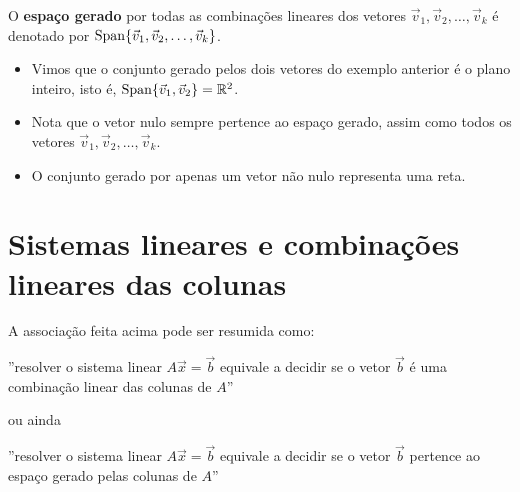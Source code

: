 \documentclass[../livro.tex]{subfiles}  %
\begin{document}
O \textbf{espaço gerado} por todas as combinações lineares dos vetores $\vec{v}_1, \vec{v}_2, \dots, \vec{v}_k$ é denotado por $\operatorname{Span} \{ \vec{v}_1, \vec{v}_2, \dots, \vec{v}_k \}$.

\begin{itemize}
\item Vimos que o conjunto gerado pelos dois vetores do exemplo anterior é o plano inteiro, isto é, $\operatorname{Span} \{ \vec{v}_1, \vec{v}_2 \} = \mathbb{R}^2$.
\item Nota que o vetor nulo sempre pertence ao espaço gerado, assim como todos os vetores $\vec{v}_1, \vec{v}_2, \dots, \vec{v}_k$.
\item O conjunto gerado por apenas um vetor não nulo representa uma reta.
\end{itemize}



\section{Sistemas lineares e combinações lineares das colunas}

A associação feita acima pode ser resumida como:
\begin{center}
  ''resolver o sistema linear $A \vec{x} = \vec{b}$ equivale a decidir
  se o vetor $\vec{b}$ é uma combinação linear das colunas de $A$''
\end{center}
ou ainda
\begin{center}
  ''resolver o sistema linear $A \vec{x} = \vec{b}$ equivale a decidir se o vetor $\vec{b}$ pertence ao espaço gerado pelas colunas de $A$''
\end{center}
\end{document}
